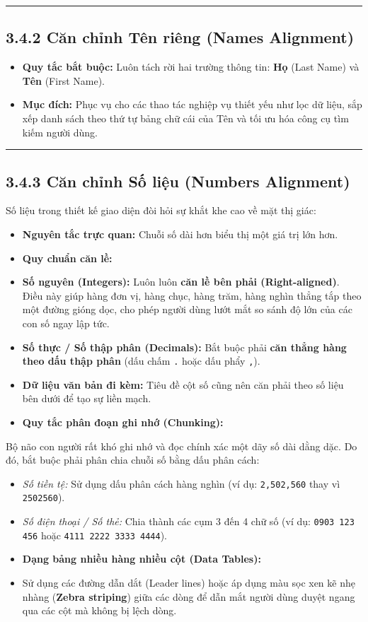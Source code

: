 \documentclass[11pt,a4paper,oneside]{report}
\begin{document}
\bigskip\hrule\bigskip

\subsection{3.4.2 Căn chỉnh Tên riêng (Names Alignment)}
\begin{itemize}[leftmargin=1.5em]
\item \textbf{Quy tắc bắt buộc:} Luôn tách rời hai trường thông tin: \textbf{Họ} (Last Name) và \textbf{Tên} (First Name).
\item \textbf{Mục đích:} Phục vụ cho các thao tác nghiệp vụ thiết yếu như lọc dữ liệu, sắp xếp danh sách theo thứ tự bảng chữ cái của Tên và tối ưu hóa công cụ tìm kiếm người dùng.
\end{itemize}

\bigskip\hrule\bigskip

\subsection{3.4.3 Căn chỉnh Số liệu (Numbers Alignment)}
Số liệu trong thiết kế giao diện đòi hỏi sự khắt khe cao về mặt thị giác:

\begin{itemize}[leftmargin=1.5em]
\item \textbf{Nguyên tắc trực quan:} Chuỗi số dài hơn biểu thị một giá trị lớn hơn.
\item \textbf{Quy chuẩn căn lề:}
\item \textbf{Số nguyên (Integers):} Luôn luôn \textbf{căn lề bên phải (Right-aligned)}. Điều này giúp hàng đơn vị, hàng chục, hàng trăm, hàng nghìn thẳng tắp theo một đường gióng dọc, cho phép người dùng lướt mắt so sánh độ lớn của các con số ngay lập tức.
\item \textbf{Số thực / Số thập phân (Decimals):} Bắt buộc phải \textbf{căn thẳng hàng theo dấu thập phân} (dấu chấm \texttt{.} hoặc dấu phẩy \texttt{,}).
\item \textbf{Dữ liệu văn bản đi kèm:} Tiêu đề cột số cũng nên căn phải theo số liệu bên dưới để tạo sự liền mạch.
\item \textbf{Quy tắc phân đoạn ghi nhớ (Chunking):}  
\end{itemize}
Bộ não con người rất khó ghi nhớ và đọc chính xác một dãy số dài dằng dặc. Do đó, bắt buộc phải phân chia chuỗi số bằng dấu phân cách:

\begin{itemize}[leftmargin=1.5em]
\item \textit{Số tiền tệ:} Sử dụng dấu phân cách hàng nghìn (ví dụ: \texttt{2,502,560} thay vì \texttt{2502560}).
\item \textit{Số điện thoại / Số thẻ:} Chia thành các cụm 3 đến 4 chữ số (ví dụ: \texttt{0903 123 456} hoặc \texttt{4111 2222 3333 4444}).
\item \textbf{Dạng bảng nhiều hàng nhiều cột (Data Tables):}
\item Sử dụng các đường dẫn dắt (Leader lines) hoặc áp dụng màu sọc xen kẽ nhẹ nhàng (\textbf{Zebra striping}) giữa các dòng để dẫn mắt người dùng duyệt ngang qua các cột mà không bị lệch dòng.
\end{itemize}
\end{document}
